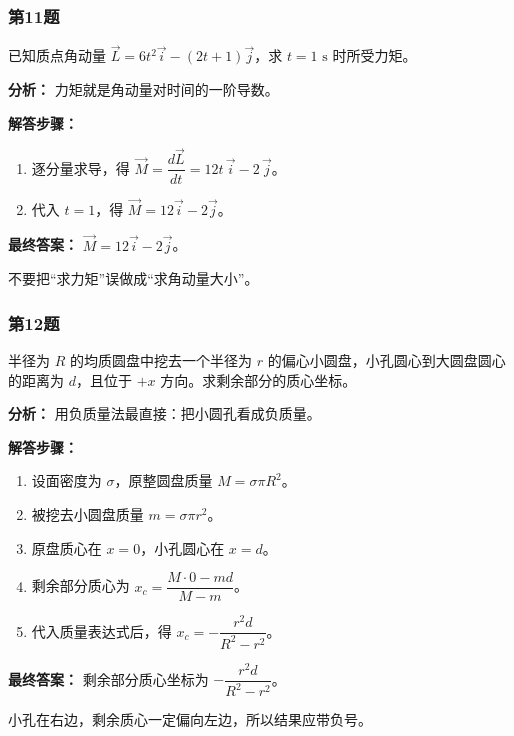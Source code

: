 \documentclass[12pt,a4paper]{ctexart}
\begin{document}
\subsubsection*{第11题}
\begin{tcolorbox}[colback=gray!2!white,colframe=black!60,title={题目}]
已知质点角动量 \(\vec L=6t^2\vec i-(2t+1)\vec j\)，求 \(t=1\text{ s}\) 时所受力矩。\par
\end{tcolorbox}
\begin{tcolorbox}[colback=blue!2!white,colframe=blue!55!black,title={完整答案}]
\textbf{分析：}
力矩就是角动量对时间的一阶导数。\par
\textbf{解答步骤：}
\begin{enumerate}
\item 逐分量求导，得 \(\vec M=\dfrac{d\vec L}{dt}=12t\,\vec i-2\,\vec j\)。
\item 代入 \(t=1\)，得 \(\vec M=12\vec i-2\vec j\)。
\end{enumerate}
\textbf{最终答案：}
\(\vec M=12\vec i-2\vec j\)。\par
\end{tcolorbox}
\begin{tcolorbox}[colback=red!2!white,colframe=red!55!black,title={易错点}]
不要把“求力矩”误做成“求角动量大小”。\par
\end{tcolorbox}

\subsubsection*{第12题}
\begin{tcolorbox}[colback=gray!2!white,colframe=black!60,title={题目}]
半径为 \(R\) 的均质圆盘中挖去一个半径为 \(r\) 的偏心小圆盘，小孔圆心到大圆盘圆心的距离为 \(d\)，且位于 \(+x\) 方向。求剩余部分的质心坐标。\par
\end{tcolorbox}
\begin{tcolorbox}[colback=blue!2!white,colframe=blue!55!black,title={完整答案}]
\textbf{分析：}
用负质量法最直接：把小圆孔看成负质量。\par
\textbf{解答步骤：}
\begin{enumerate}
\item 设面密度为 \(\sigma\)，原整圆盘质量 \(M=\sigma\pi R^2\)。
\item 被挖去小圆盘质量 \(m=\sigma\pi r^2\)。
\item 原盘质心在 \(x=0\)，小孔圆心在 \(x=d\)。
\item 剩余部分质心为 \(x_c=\dfrac{M\cdot 0-md}{M-m}\)。
\item 代入质量表达式后，得 \(x_c=-\dfrac{r^2d}{R^2-r^2}\)。
\end{enumerate}
\textbf{最终答案：}
剩余部分质心坐标为 \(-\dfrac{r^2d}{R^2-r^2}\)。\par
\end{tcolorbox}
\begin{tcolorbox}[colback=red!2!white,colframe=red!55!black,title={易错点}]
小孔在右边，剩余质心一定偏向左边，所以结果应带负号。\par
\end{tcolorbox}
\end{document}
